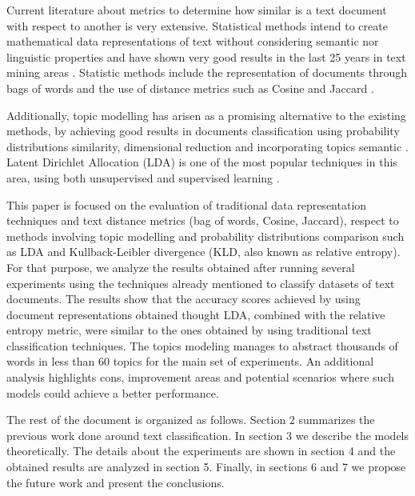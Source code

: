 \documentclass[preprint,12pt,3p]{elsarticle}
\begin{document}
Current literature about metrics to determine how similar is a text document with respect to another is very extensive. Statistical methods intend to create mathematical data representations of text without considering semantic nor linguistic properties and have shown very good results in the last 25 years in text mining areas \cite{srivastava2009text}. Statistic methods include the representation of documents through bags of words and the use of distance metrics such as Cosine and Jaccard \cite{wang2016non, soto2015similarity}. \par

Additionally, topic modelling has arisen as a promising alternative to the existing methods, by achieving good results in documents classification using probability distributions similarity, dimensional reduction and incorporating topics semantic \cite{ bae2014computing, bougiatiotis2016content, huang2008similarity, metzler2007similarity}. Latent Dirichlet Allocation (LDA) is one of the most popular techniques in this area, using both unsupervised and supervised learning \cite{mcauliffe2008supervised}. \par

This paper is focused on the evaluation of traditional data representation techniques and text distance metrics (bag of words, Cosine, Jaccard), respect to methods involving topic modelling and probability distributions comparison such as LDA and Kullback-Leibler divergence (KLD, also known as relative entropy). For that purpose, we analyze the results obtained after running several experiments using the techniques already mentioned to classify datasets of text documents. The results show that the accuracy scores achieved by using document representations obtained thought LDA, combined with the relative entropy metric, were similar to the ones obtained by using traditional text classification techniques. The topics modeling manages to abstract thousands of words in less than 60 topics for the main set of experiments. An additional analysis highlights cons, improvement areas and potential scenarios where such models could achieve a better performance. \par

The rest of the document is organized as follows. Section 2 summarizes the previous work done around text classification. In section 3 we describe the models theoretically. The details about the experiments are shown in section 4 and the obtained results are analyzed in section 5. Finally, in sections 6 and 7 we propose the future work and present the conclusions.
\end{document}
